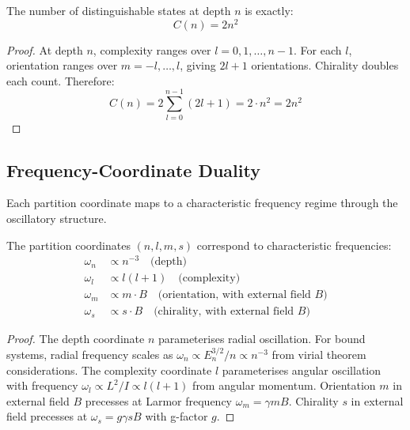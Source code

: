 \begin{theorem}
\label{thm:capacity}
The number of distinguishable states at depth $n$ is exactly:
\begin{equation}
C(n) = 2n^2
\end{equation}
\end{theorem}

\begin{proof}
At depth $n$, complexity ranges over $l = 0, 1, \ldots, n-1$. For each $l$, orientation ranges over $m = -l, \ldots, l$, giving $2l + 1$ orientations. Chirality doubles each count. Therefore:
\begin{equation}
C(n) = 2 \sum_{l=0}^{n-1} (2l + 1) = 2 \cdot n^2 = 2n^2
\end{equation}
\end{proof}

\subsection{Frequency-Coordinate Duality}

Each partition coordinate maps to a characteristic frequency regime through the oscillatory structure.

\begin{theorem}
\label{thm:freq_duality}
The partition coordinates $(n, l, m, s)$ correspond to characteristic frequencies:
\begin{align}
\omega_n &\propto n^{-3} \quad \text{(depth)} \\
\omega_l &\propto l(l+1) \quad \text{(complexity)} \\
\omega_m &\propto m \cdot B \quad \text{(orientation, with external field } B\text{)} \\
\omega_s &\propto s \cdot B \quad \text{(chirality, with external field } B\text{)}
\end{align}
\end{theorem}

\begin{proof}
The depth coordinate $n$ parameterises radial oscillation. For bound systems, radial frequency scales as $\omega_n \propto E_n^{3/2}/n \propto n^{-3}$ from virial theorem considerations. The complexity coordinate $l$ parameterises angular oscillation with frequency $\omega_l \propto L^2/I \propto l(l+1)$ from angular momentum. Orientation $m$ in external field $B$ precesses at Larmor frequency $\omega_m = \gamma m B$. Chirality $s$ in external field precesses at $\omega_s = g \gamma s B$ with g-factor $g$.
\end{proof}


